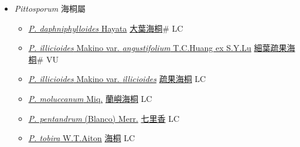 
  \begin{itemize}
 \item[] \textit{Pittosporum} 海桐屬
                    
  \begin{itemize}
        \item[] \href{http://www.theplantlist.org/tpl1.1/search?q=Pittosporum+daphniphylloides}{\textit{P. daphniphylloides} Hayata}   \href{\detokenize{http://taibnet.sinica.edu.tw/chi/taibnet_species_list.php?T2=大葉海桐&T2_new_value=true&fr=y}}{大葉海桐}\# LC
        \item[] \href{http://www.theplantlist.org/tpl1.1/search?q=Pittosporum+illicioides+var.+angustifolium}{\textit{P. illicioides} Makino var. \textit{angustifolium} T.C.Huang ex S.Y.Lu}   \href{\detokenize{http://taibnet.sinica.edu.tw/chi/taibnet_species_list.php?T2=細葉疏果海桐&T2_new_value=true&fr=y}}{細葉疏果海桐}\# VU
        \item[] \href{http://www.theplantlist.org/tpl1.1/search?q=Pittosporum+illicioides+var.+illicioides}{\textit{P. illicioides} Makino var. \textit{illicioides}}   \href{\detokenize{http://taibnet.sinica.edu.tw/chi/taibnet_species_list.php?T2=疏果海桐&T2_new_value=true&fr=y}}{疏果海桐} LC
        \item[] \href{http://www.theplantlist.org/tpl1.1/search?q=Pittosporum+moluccanum}{\textit{P. moluccanum} Miq.}   \href{\detokenize{http://taibnet.sinica.edu.tw/chi/taibnet_species_list.php?T2=蘭嶼海桐&T2_new_value=true&fr=y}}{蘭嶼海桐} LC
        \item[] \href{http://www.theplantlist.org/tpl1.1/search?q=Pittosporum+pentandrum}{\textit{P. pentandrum} (Blanco) Merr.}   \href{\detokenize{http://taibnet.sinica.edu.tw/chi/taibnet_species_list.php?T2=七里香&T2_new_value=true&fr=y}}{七里香} LC
        \item[] \href{http://www.theplantlist.org/tpl1.1/search?q=Pittosporum+tobira}{\textit{P. tobira} W.T.Aiton}   \href{\detokenize{http://taibnet.sinica.edu.tw/chi/taibnet_species_list.php?T2=海桐&T2_new_value=true&fr=y}}{海桐} LC
  \end{itemize}
  \end{itemize}
